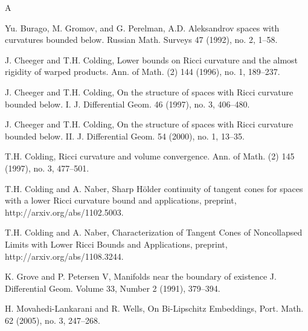 \documentclass[11pt]{article}
\begin{document}
\begin{thebibliography}{A}

Yu. Burago, M. Gromov, and G. Perelman,
A.D. Aleksandrov spaces with curvatures bounded below. Russian Math. Surveys 47 (1992), no. 2, 1--58.

J. Cheeger and T.H. Colding,
Lower bounds on Ricci curvature and the
almost rigidity of warped products.  Ann. of Math. (2)  144  (1996),
no. 1, 189--237.

J. Cheeger and T.H. Colding,
On the structure of spaces with Ricci curvature
bounded below. I.  J. Differential Geom.  46  (1997),  no. 3, 406--480.

J. Cheeger and T.H. Colding,
On the structure of spaces with Ricci
curvature bounded below. II.  J. Differential Geom.  54  (2000),  no. 1, 13--35.

T.H. Colding,
Ricci curvature and volume convergence.
Ann. of Math. (2)  145  (1997),  no. 3, 477--501.

T.H. Colding and A. Naber,
Sharp H\"older continuity of tangent cones for spaces with a lower Ricci curvature bound and applications,
preprint, http://arxiv.org/abs/1102.5003.

T.H. Colding and A. Naber,
Characterization of Tangent Cones of Noncollapsed Limits with Lower Ricci Bounds and Applications,
preprint, http://arxiv.org/abs/1108.3244.

K. Grove and P. Petersen V,
Manifolds near the boundary of existence
J. Differential Geom. Volume 33, Number 2 (1991), 379--394.

H. Movahedi-Lankarani and R. Wells,
On Bi-Lipschitz Embeddings,
Port. Math. 62 (2005), no. 3, 247--268.


\end{thebibliography}
\end{document}
